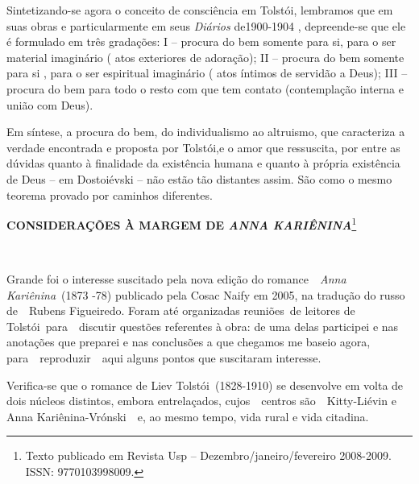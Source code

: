 Sintetizando-se agora o conceito de consciência em Tolstói, lembramos
que em suas obras e particularmente em seus \emph{Diários} de1900-1904 ,
depreende-se que ele é formulado em três gradações: I -- procura do bem
somente para si, para o ser material imaginário ( atos exteriores de
adoração); II -- procura do bem somente para si , para o ser espiritual
imaginário ( atos íntimos de servidão a Deus); III -- procura do bem
para todo o resto com que tem contato (contemplação interna e união com
Deus).

Em síntese, a procura do bem, do individualismo ao altruismo, que
caracteriza a verdade encontrada e proposta por Tolstói,e o amor que
ressuscita, por entre as dúvidas quanto à finalidade da existência
humana e quanto à própria existência de Deus -- em Dostoiévski -- não
estão tão distantes assim. São como o mesmo teorema provado por caminhos
diferentes.

\textbf{CONSIDERAÇÕES À MARGEM DE \emph{ANNA KARIÊNINA}}\footnote{Texto
  publicado em Revista Usp -- Dezembro/janeiro/fevereiro 2008-2009.
  ISSN: 9770103998009.}

~

Grande foi o interesse suscitado pela nova edição do romance~~\emph{Anna
Kariênina}~(1873 -78) publicado pela Cosac Naify em 2005, na tradução do
russo de~~Rubens Figueiredo. Foram até organizadas reuniões~de leitores
de Tolstói~para~~discutir questões referentes à obra: de uma delas
participei e nas anotações que preparei e nas conclusões a que chegamos
me baseio agora, para~~reproduzir~~aqui alguns pontos que suscitaram
interesse.

Verifica-se que o romance de Liev Tolstói~(1828-1910) se desenvolve em
volta de dois núcleos distintos, embora entrelaçados, cujos~~centros
são~~Kitty-Liévin e Anna Kariênina-Vrónski~~e, ao mesmo tempo, vida
rural e vida citadina.

